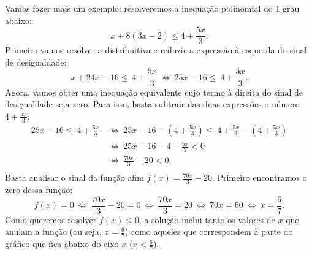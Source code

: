 Vamos fazer mais um exemplo: resolveremos a inequação polinomial do 1 grau abaixo:
$$
x + 8(3x - 2) \leq 4 + \frac{5x}{3}.
$$
Primeiro vamos resolver a distribuitiva e reduzir a expressão à esquerda do sinal de desigualdade:
$$
x + 24x - 16 \leq \ 4 + \frac{5x}{3} \ \iff \ 25x - 16 \leq \ 4 + \frac{5x}{3}.
$$
Agora, vamos obter uma inequação equivalente cujo termo à direita do sinal de desigualdade seja zero. Para isso, basta subtrair das duas expressões o número $4 + \frac{5x}{3}$:
\begin{align*}
25x - 16 \leq \ 4 + \frac{5x}{3} \ &\iff \ 25x - 16 - (4 + \frac{5x}{3}) \leq \ 4 + \frac{5x}{3} - (4 + \frac{5x}{3}) \\
 & \iff \ 25x - 16 -4 - \frac{5x}{3} < 0 \\
 & \iff \ \frac{70x}{3} - 20 < 0. \\
\end{align*}
Basta analisar o sinal da função afim $f(x) = \frac{70x}{3} - 20$. Primeiro encontramos o zero dessa função:
$$
f(x) = 0 \ \iff \ \frac{70x}{3} - 20 = 0 \ \iff \ \frac{70x}{3} = 20 \ \iff \ 70x = 60 \ \iff \ x = \frac{6}{7}.
$$
Como queremos resolver $f(x) \leq 0$, a solução inclui tanto os valores de $x$ que anulam a função (ou seja, $x = \frac{6}{7}$)
como aqueles que correspondem à parte do gráfico que fica abaixo do eixo $x$ ($x < \frac{6}{7}$).

